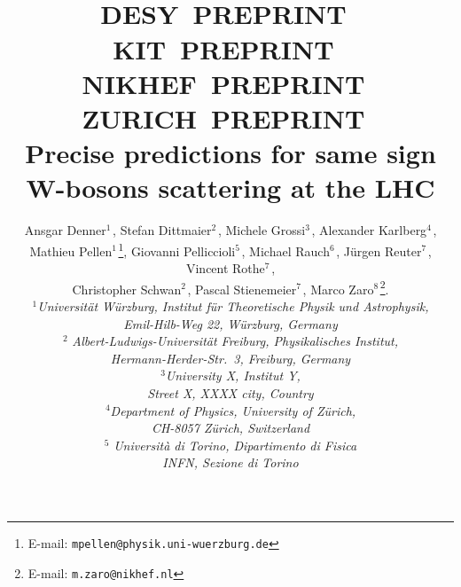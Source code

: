 \documentclass[11pt,epsf]{article}
\begin{document}
\title{\hfill ~\\[-30mm]
\phantom{h} \hfill\mbox{\small DESY PREPRINT } \\
\vspace{-10mm}
\phantom{h} \hfill\mbox{\small KIT PREPRINT } \\
\vspace{-10mm}
\phantom{h} \hfill\mbox{\small NIKHEF PREPRINT } \\
\vspace{-10mm}
\phantom{h} \hfill\mbox{\small ZURICH PREPRINT }
\\[1cm]
\textbf{Precise predictions for same sign W-bosons scattering at the LHC}}

\date{}
\author{
Ansgar Denner$^{1\,}$,
Stefan Dittmaier$^{2\,}$,
Michele Grossi$^{3\,}$,
Alexander Karlberg$^{4\,}$, \\
Mathieu Pellen$^{1\,}$\footnote{E-mail:
  \texttt{mpellen@physik.uni-wuerzburg.de}},
Giovanni  Pelliccioli$^{5\,}$,
Michael Rauch$^{6\,}$,
J\"urgen Reuter$^{7\,}$,
Vincent Rothe$^{7\,}$, \\
Christopher Schwan$^{2\,}$,
Pascal Stienemeier$^{7\,}$,
Marco Zaro$^{8\,}$\footnote{E-mail:
  \texttt{m.zaro@nikhef.nl}}.
\\[9mm]
{\small\it
$^1$Universit\"at W\"urzburg, %
        Institut f\"ur Theoretische Physik und Astrophysik,} \\ %
{\small\it Emil-Hilb-Weg 22,  W\"urzburg, %
        Germany}\\[3mm]
$^2${\small\it
Albert-Ludwigs-Universit\"at Freiburg, Physikalisches Institut,} \\ %
{\small\it Hermann-Herder-Str.\ 3,  Freiburg, Germany}\\[3mm]
{\small\it
$^3$University X, %
        Institut Y,} \\ %
{\small\it Street X, \linebreak %
        XXXX city, %
        Country}\\[3mm]
{\small\it
$^4$Department of Physics, University of Z\"urich,} \\ %
{\small\it CH-8057
Z\"urich, Switzerland}\\[3mm]
$^5${\small\it
Universit\`a di Torino, Dipartimento di Fisica \\ %
INFN, Sezione di Torino    } \\ %
}
\end{document}
